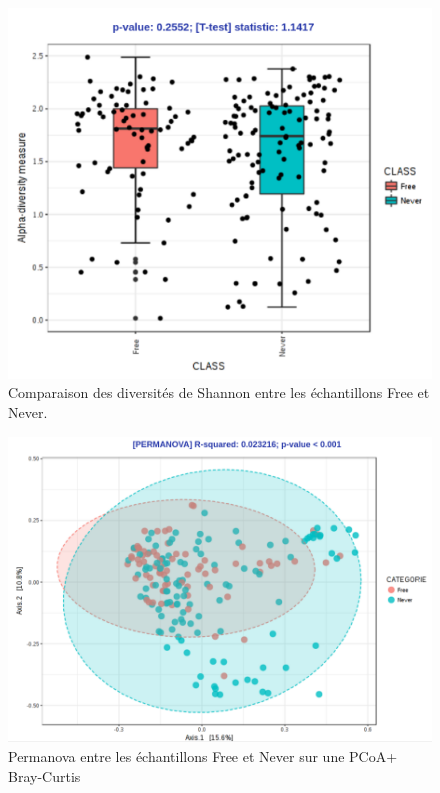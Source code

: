 \documentclass[12pt,a4paper]{article}
\begin{document}
\begin{figure}
\begin{center}
\includegraphics[scale=0.70]{img/compare.png}\hfill
\end{center}
\caption{Comparaison des diversités de Shannon entre les échantillons Free et Never.}
\label{compare}
\end{figure}


\begin{figure}[t]
\begin{center}
\includegraphics[scale=0.50]{img/pcoa.png}\hfill
\end{center}
\caption{Permanova entre les échantillons Free et Never sur une PCoA+ Bray-Curtis}
\label{pcoa}
\end{figure}
\end{document}
